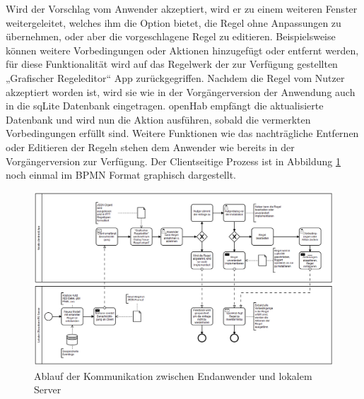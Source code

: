 Wird der Vorschlag vom Anwender akzeptiert, wird er zu einem weiteren Fenster weitergeleitet, welches ihm die Option bietet, die Regel ohne Anpassungen zu übernehmen, oder aber die vorgeschlagene Regel zu editieren. Beispielsweise können weitere Vorbedingungen oder Aktionen hinzugefügt oder entfernt werden, für diese Funktionalität wird auf das Regelwerk der zur Verfügung gestellten „Grafischer Regeleditor“ App zurückgegriffen. 
Nachdem die Regel vom Nutzer akzeptiert worden ist, wird sie wie in der Vorgängerversion der Anwendung auch in die sqLite Datenbank eingetragen. openHab empfängt die aktualisierte Datenbank und wird nun die Aktion ausführen, sobald die vermerkten Vorbedingungen erfüllt sind.
Weitere Funktionen wie das nachträgliche Entfernen oder Editieren der Regeln stehen dem Anwender wie bereits in der Vorgängerversion zur Verfügung.
Der Clientseitige Prozess ist in Abbildung \ref{fig:Kommunikationsablauf} noch einmal im BPMN Format graphisch dargestellt.



\begin{figure}[!ht]
    \centering
    \includegraphics[width= 1.52\textwidth, angle=90,origin=c]{figures/Appbildungen/diagramm_app.PNG}
    \caption{Ablauf der Kommunikation zwischen Endanwender und lokalem Server}
    \label{fig:Kommunikationsablauf}
\end{figure}